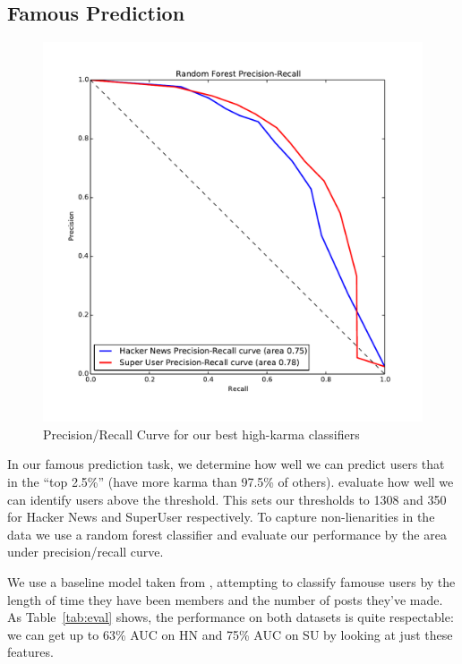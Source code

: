\documentclass[11pt]{article}
\begin{document}
\subsection{Famous Prediction}
\label{sec:classification}

\begin{figure}[h]
\centering
\includegraphics[width=\linewidth]{classification_pr_curve}
\caption{Precision/Recall Curve for our best high-karma classifiers}
\label{fig:classification}
\end{figure}

In our famous prediction task, we determine how well we can predict users that
in the ``top 2.5\%'' (have more karma than 97.5\% of others).
evaluate how well we can identify users above the threshold. This sets our
thresholds to 1308 and 350 for Hacker News and SuperUser respectively. To
capture non-lienarities in the data we use a random forest classifier and
evaluate our performance by the area under precision/recall curve.

We use a baseline model taken from \citet{movshovitzanalysis}, attempting to
classify famouse users by the length of time they have been members and the number
of posts they've made. As Table~\ref{tab:eval} shows, the performance on both
datasets is quite respectable: we can get up to 63\% AUC on HN and 75\% AUC on
SU by looking at just these features.
\end{document}
